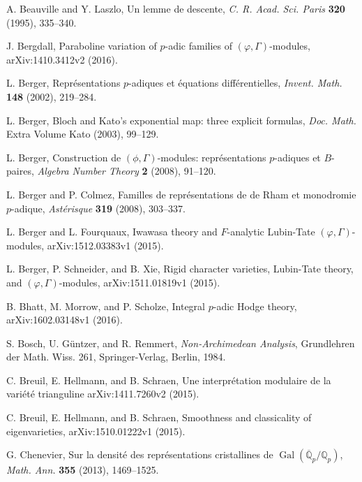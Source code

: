 \documentclass[12pt]{amsart}
\theoremstyle{definition}
\numberwithin{equation}{theorem}
\newcommand{\QQ}{\mathbb{Q}}
\DeclareMathOperator{\Gal}{Gal}
\begin{document}
\begin{thebibliography}{99}

A. Beauville and Y. Laszlo, Un lemme de descente, \textit{C. R. Acad. Sci. Paris} \textbf{320} (1995), 335--340.

J. Bergdall, Paraboline variation of $p$-adic families of $(\varphi,\Gamma)$-modules,
arXiv:1410.3412v2 (2016).

L. Berger, Repr\'esentations $p$-adiques et \'equations diff\'erentielles,
\textit{Invent. Math.} \textbf{148} (2002), 219--284.

L. Berger, Bloch and Kato's exponential map: three explicit formulas,
\textit{Doc. Math.} Extra Volume Kato (2003), 99--129.

L. Berger, Construction de $(\phi, \Gamma)$-modules: repr\'esentations $p$-adiques et $B$-paires, \textit{Algebra Number Theory} \textbf{2} (2008), 91--120.

L. Berger and P. Colmez, Familles de repr\'esentations de de Rham et monodromie $p$-adique, \textit{Ast\'erisque} \textbf{319} (2008), 303--337.

L. Berger and L. Fourquaux, Iwawasa theory and $F$-analytic Lubin-Tate $(\varphi, \Gamma)$-modules, arXiv:1512.03383v1 (2015).

L. Berger, P. Schneider, and B. Xie, Rigid character varieties, Lubin-Tate theory,
and $(\varphi, \Gamma)$-modules,  arXiv:1511.01819v1 (2015).

B. Bhatt, M. Morrow, and P. Scholze,
Integral $p$-adic Hodge theory, arXiv:1602.03148v1 (2016).

S. Bosch, U. G\"untzer, and R. Remmert,
\textit{Non-Archimedean Analysis},
Grundlehren der Math. Wiss. 261, Springer-Verlag, Berlin, 1984.

C. Breuil, E. Hellmann, and B. Schraen,
Une interpr\'etation modulaire de la vari\'et\'e trianguline
arXiv:1411.7260v2 (2015).

C. Breuil, E. Hellmann, and B. Schraen,
Smoothness and classicality of eigenvarieties,
arXiv:1510.01222v1 (2015).

G. Chenevier, Sur la densit\'e des repr\'esentations cristallines de
$\Gal(\overline{\QQ}_p/\QQ_p)$, \textit{Math. Ann.} \textbf{355} (2013), 1469--1525.


\end{thebibliography}
\end{document}
